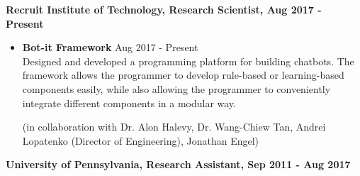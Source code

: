 {\bf Recruit Institute of Technology, Research Scientist, Aug 2017 - Present}
\begin{itemize}
\item{\bf Bot-it Framework} \hfill Aug 2017 - Present \\
Designed and developed a programming platform for building chatbots. The
framework allows the programmer to develop rule-based or learning-based components
easily, while also allowing the programmer to conveniently integrate different
components in a modular way.

(in collaboration with Dr. Alon Halevy, Dr. Wang-Chiew Tan, Andrei Lopatenko
(Director of Engineering), Jonathan Engel)
\end{itemize}


{\bf University of Pennsylvania, Research Assistant, Sep 2011 - Aug 2017}

